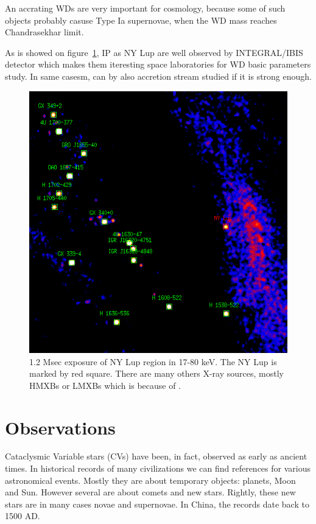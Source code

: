 \documentclass[oneside,a4paper,11pt]{report}
\begin{document}
An accrating WDs are very important for cosmology, because some of such objects probably casuse Type Ia supernovae, 
when the WD mass reaches Chandrasekhar limit. 

As is showed on figure~\ref{nylup1}, IP as NY Lup are well observed by INTEGRAL/IBIS detector which makes them 
iteresting space laboratories for WD basic parameters study. In same casesm, can by also accretion stream studied
if it is strong enough. 
    


\begin{figure}[!hbt]
\centering
\includegraphics[totalheight=12cm]{plot/ds9_3}
\caption{1.2 Msec exposure of NY Lup region in 17-80 keV. The NY Lup is marked by red square. There are many others X-ray sources,
mostly HMXBs or LMXBs which is because of .}
\label{nylup1} 
\end{figure}



\section{Observations}
Cataclysmic Variable stars (CVs) have been, in fact, observed as early as ancient times. In historical 
records of  many civilizations we can find references for various astronomical events. Mostly they are 
about temporary objects: planets, Moon and Sun. However several are about comets and new stars. Rightly, 
these new stars are in many cases novae and supernovae. In China, the records date back to 1500 AD. 
\end{document}
